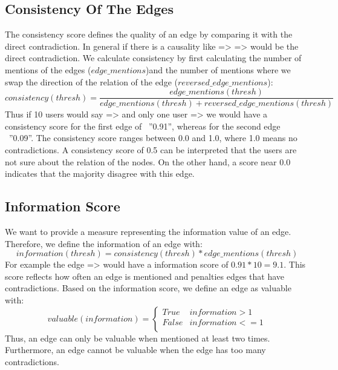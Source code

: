 \subsection{Consistency Of The Edges}\label{subsec:consistency-of-the-edges}
The consistency score defines the quality of an edge by comparing it with the direct contradiction.
In general if there is a causality like  =>   =>  would be the direct contradiction.
We calculate consistency by first calculating the number of mentions of the edges ($edge\_mentions$)and the number of mentions where we swap the direction of the relation of the edge ($reversed\_edge\_mentions$):
\begin{equation}
    \label{eq:consistency-score}
    consistency(thresh) = \frac{edge\_mentions(thresh)}{edge\_mentions(thresh) + reversed\_edge\_mentions(thresh)}
\end{equation}
Thus if 10 users would say  =>  and only one user  =>  we would have a consistency score for the first edge of ~''0.91'', whereas for the second edge ~''0.09''.
The consistency score ranges between 0.0 and 1.0, where 1.0 means no contradictions.
A consistency score of 0.5 can be interpreted that the users are not sure about the relation of the nodes.
On the other hand, a score near 0.0 indicates that the majority disagree with this edge.


\subsection{Information Score}\label{subsec:information-score}
We want to provide a measure representing the information value of an edge.
Therefore, we define the information of an edge with:
\begin{equation}
    \label{eq:information-score}
    information(thresh) = consistency(thresh) * edge\_mentions(thresh)
\end{equation}
For example the edge  =>  would have a information score of $0.91 * 10=9.1$.
This score reflects how often an edge is mentioned and penalties edges that have contradictions.
Based on the information score, we define an edge as valuable with:
\begin{equation}
    \label{eq:value_edge}
    valuable(information) = \left\{
    \begin{array}{ll}
        True  & information > 1  \\
        False & information <= 1 \\
    \end{array}
    \right.
\end{equation}
Thus, an edge can only be valuable when mentioned at least two times.
Furthermore, an edge cannot be valuable when the edge has too many contradictions.

